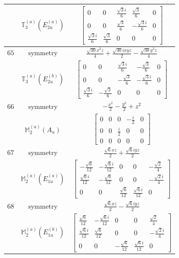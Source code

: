 \documentclass[fleqn,8pt,landscape]{jsarticle}
\begin{document}
\begin{longtable}{ccc}
$  $ & $ \mathbb{T}_{3}^{(a)}(E_{2u}^{(a)}) $ & $ \begin{bmatrix} 0 & 0 & \frac{\sqrt{3} i}{6} & \frac{\sqrt{3}}{6} & 0 \\ 0 & 0 & \frac{\sqrt{3}}{6} & - \frac{\sqrt{3} i}{6} & 0 \\ \frac{\sqrt{3} i}{6} & \frac{\sqrt{3}}{6} & 0 & 0 & 0 \end{bmatrix} $ \\ \hline
$ 65 $ & $ \text{symmetry} $ & $ \frac{\sqrt{30} x^{2} z}{4} + \frac{\sqrt{30} i x y z}{2} - \frac{\sqrt{30} y^{2} z}{4} $ \\
$  $ & $ \mathbb{T}_{3}^{(a)}(E_{2u}^{(b)}) $ & $ \begin{bmatrix} 0 & 0 & \frac{\sqrt{3} i}{6} & - \frac{\sqrt{3}}{6} & 0 \\ 0 & 0 & - \frac{\sqrt{3}}{6} & - \frac{\sqrt{3} i}{6} & 0 \\ \frac{\sqrt{3} i}{6} & - \frac{\sqrt{3}}{6} & 0 & 0 & 0 \end{bmatrix} $ \\ \hline
$ 66 $ & $ \text{symmetry} $ & $ - \frac{x^{2}}{2} - \frac{y^{2}}{2} + z^{2} $ \\
$  $ & $ \mathbb{M}_{2}^{(a)}(A_{u}) $ & $ \begin{bmatrix} 0 & 0 & 0 & - \frac{i}{2} & 0 \\ 0 & 0 & \frac{i}{2} & 0 & 0 \\ 0 & 0 & 0 & 0 & 0 \end{bmatrix} $ \\ \hline
$ 67 $ & $ \text{symmetry} $ & $ \frac{\sqrt{6} x z}{2} + \frac{\sqrt{6} i y z}{2} $ \\
$  $ & $ \mathbb{M}_{2}^{(a)}(E_{1u}^{(a)}) $ & $ \begin{bmatrix} - \frac{\sqrt{6}}{12} & - \frac{\sqrt{6} i}{12} & 0 & 0 & - \frac{\sqrt{2}}{4} \\ \frac{\sqrt{6} i}{12} & - \frac{\sqrt{6}}{12} & 0 & 0 & - \frac{\sqrt{2} i}{4} \\ 0 & 0 & \frac{\sqrt{6}}{12} & \frac{\sqrt{6} i}{12} & 0 \end{bmatrix} $ \\ \hline
$ 68 $ & $ \text{symmetry} $ & $ \frac{\sqrt{6} x z}{2} - \frac{\sqrt{6} i y z}{2} $ \\
$  $ & $ \mathbb{M}_{2}^{(a)}(E_{1u}^{(b)}) $ & $ \begin{bmatrix} \frac{\sqrt{6}}{12} & - \frac{\sqrt{6} i}{12} & 0 & 0 & \frac{\sqrt{2}}{4} \\ \frac{\sqrt{6} i}{12} & \frac{\sqrt{6}}{12} & 0 & 0 & - \frac{\sqrt{2} i}{4} \\ 0 & 0 & - \frac{\sqrt{6}}{12} & \frac{\sqrt{6} i}{12} & 0 \end{bmatrix} $ \\ \hline

\end{longtable}
\end{document}
